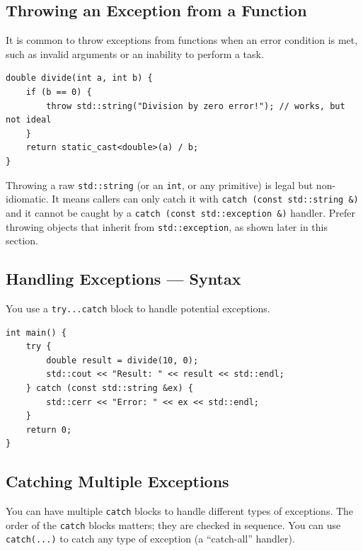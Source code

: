 \subsection{Throwing an Exception from a Function}
It is common to throw exceptions from functions when an error condition is met, such as invalid arguments or an inability to perform a task.
\begin{lstlisting}
double divide(int a, int b) {
	if (b == 0) {
		throw std::string("Division by zero error!"); // works, but not ideal
	}
	return static_cast<double>(a) / b;
}
\end{lstlisting}

\begin{remark}
	Throwing a raw \texttt{std::string} (or an \texttt{int}, or any primitive) is legal but non-idiomatic. It means callers can only catch it with \texttt{catch (const std::string \&)} and it cannot be caught by a \texttt{catch (const std::exception \&)} handler. Prefer throwing objects that inherit from \texttt{std::exception}, as shown later in this section.
\end{remark}

\subsection{Handling Exceptions --- Syntax}
You use a \texttt{try...catch} block to handle potential exceptions.
\begin{lstlisting}
int main() {
	try {
		double result = divide(10, 0);
		std::cout << "Result: " << result << std::endl;
	} catch (const std::string &ex) {
		std::cerr << "Error: " << ex << std::endl;
	}
	return 0;
}
\end{lstlisting}

\subsection{Catching Multiple Exceptions}
You can have multiple \texttt{catch} blocks to handle different types of exceptions. The order of the \texttt{catch} blocks matters; they are checked in sequence. You can use \texttt{catch(...)} to catch any type of exception (a ``catch-all'' handler).

